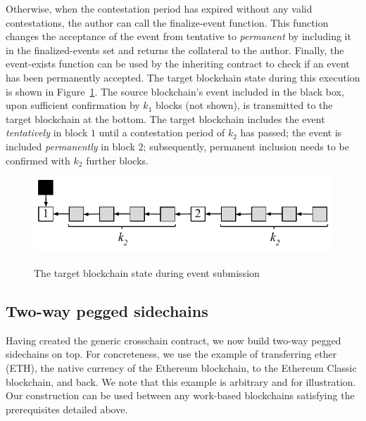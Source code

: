 Otherwise, when the contestation period has expired without any valid
contestations, the author can call the \textsf{finalize-event} function. This
function changes the acceptance of the event from tentative to \emph{permanent}
by including it in the \textsf{finalized-events} set and returns the collateral
to the author. Finally, the \textsf{event-exists} function can be used by the
inheriting contract to check if an event has been permanently accepted. The
target blockchain state during this execution is shown in
Figure~\ref{fig.contestation}. The source blockchain's event included in the
black box, upon sufficient confirmation by $k_1$ blocks (not shown), is
transmitted to the target blockchain at the bottom. The target blockchain
includes the event \emph{tentatively} in block $1$ until a contestation period
of $k_2$ has passed; the event is included \emph{permanently} in block $2$;
subsequently, permanent inclusion needs to be confirmed with $k_2$ further
blocks.

\begin{figure}[H]
    \caption{The target blockchain state during event submission}
    \centering
    \includegraphics[width=0.6 \columnwidth,keepaspectratio]{chapters/sidechains/figures/contestation.pdf}
    \label{fig.contestation}
\end{figure}

\subsection*{Two-way pegged sidechains}
Having created the generic crosschain contract, we now build two-way pegged
sidechains on top. For concreteness, we use the example of transferring ether
(ETH), the native currency of the Ethereum blockchain, to the Ethereum Classic
blockchain, and back. We note that this example is arbitrary and for
illustration. Our construction can be used between any work-based blockchains
satisfying the prerequisites detailed above.

